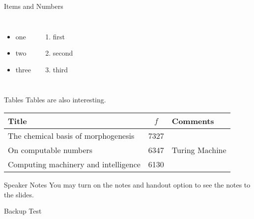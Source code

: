 \documentclass[aspectratio=169]{beamer}
\begin{document}
\begin{frame}[t]{Items and Numbers}
\begin{columns}
            \begin{itemize}
            \item one
            \item two
            \item three
            \end{itemize}
            \begin{enumerate}
            \item first
            \item second
            \item third
            \end{enumerate}
\end{columns}
\end{frame}



\begin{frame}[c]{Tables}
Tables are also interesting.
\begin{table}[ht!]
\centering
\begin{tabular}{|l|c|l|} \hline
Title&$f$&Comments\\ \hline
The chemical basis of morphogenesis & 7327 & \\ \hline
On computable numbers & 6347 & Turing Machine\\ \hline
Computing machinery and intelligence & 6130 & \\ \hline
\end{tabular}
\end{table}
\end{frame}


\begin{frame}[c]{Speaker Notes}
You may turn on the notes and handout option to see the notes to the slides.
\end{frame}


\begin{frame}[t,plain]
\end{frame}


\backupbegin

\begin{frame}{Backup}
Test
\end{frame}

\backupend
\end{document}
